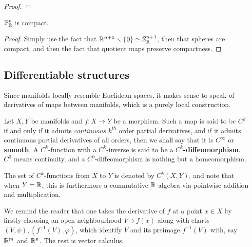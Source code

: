             \begin{proof}
                
            \end{proof}
        \begin{proposition} \label{prop: real_projective_spaces_are_compact}
            $\mathbb{P}^n_{\mathbb{R}}$ is compact.
        \end{proposition}
            \begin{proof}
                Simply use the fact that $\mathbb{R}^{n + 1} \smallsetminus \{0\} \simeq \mathbb{S}^{n + 1}_{\mathbb{R}}$, then that spheres are compact, and then the fact that quotient maps preserve compactness.
            \end{proof}

    \subsection{Differentiable structures}
        Since manifolds locally resemble Euclidean spaces, it makes sense to speak of derivatives of maps between manifolds, which is a purely local construction.
        \begin{definition} \label{def: differentiable_functions}
            Let $X, Y$ be manifolds and $f: X \to Y$ be a morphism. Such a map is said to be $C^k$ if and only if it admits \textit{continuous} $k^{th}$ order partial derivatives, and if it admits continuous partial derivatives of all orders, then we shall say that it is $C^{\infty}$ or \textbf{smooth}. A $C^k$-function with a $C^k$-inverse is said to be a \textbf{$C^k$-diffeomorphism}. $C^0$ means continuity, and a $C^0$-diffeomorphism is nothing but a homeomorphism.

            The set of $C^k$-functions from $X$ to $Y$ is denoted by $C^k(X, Y)$, and note that when $Y = \mathbb{R}$, this is furthermore a commutative $\mathbb{R}$-algebra via pointwise addition and multiplication.
        \end{definition}
        We remind the reader that one takes the derivative of $f$ at a point $x \in X$ by firstly choosing an open neighbourhood $V \ni f(x)$ along with charts $(V, \psi), (f^{-1}(V), \varphi)$, which identify $V$ and its preimage $f^{-1}(V)$ with, say $\mathbb{R}^m$ and $\mathbb{R}^n$. The rest is vector calculus.

